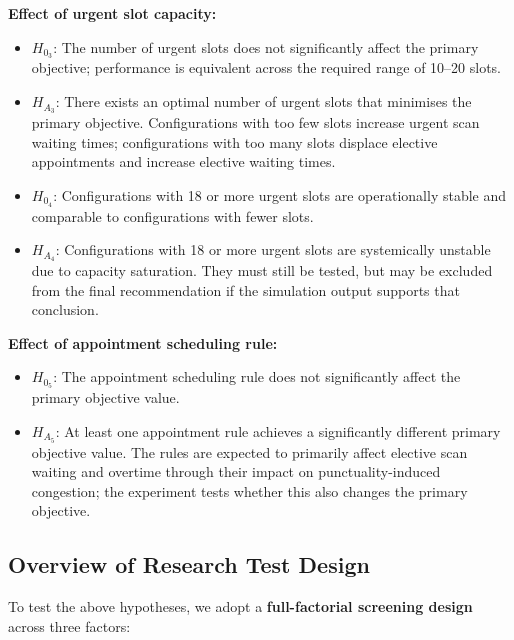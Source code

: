 \documentclass[12pt, a4paper]{article}
\begin{document}
\textbf{Effect of urgent slot capacity:}
\begin{itemize}
    \item $H_{0_3}$: The number of urgent slots does not significantly affect the primary objective; performance is equivalent across the required range of 10--20 slots.
    \item $H_{A_3}$: There exists an optimal number of urgent slots that minimises the primary objective. Configurations with too few slots increase urgent scan waiting times; configurations with too many slots displace elective appointments and increase elective waiting times.
    \item $H_{0_4}$: Configurations with 18 or more urgent slots are operationally stable and comparable to configurations with fewer slots.
    \item $H_{A_4}$: Configurations with 18 or more urgent slots are systemically unstable due to capacity saturation. They must still be tested, but may be excluded from the final recommendation if the simulation output supports that conclusion.
\end{itemize}

\textbf{Effect of appointment scheduling rule:}
\begin{itemize}
    \item $H_{0_5}$: The appointment scheduling rule does not significantly affect the primary objective value.
    \item $H_{A_5}$: At least one appointment rule achieves a significantly different primary objective value. The rules are expected to primarily affect elective scan waiting and overtime through their impact on punctuality-induced congestion; the experiment tests whether this also changes the primary objective.
\end{itemize}

\subsection{Overview of Research Test Design}

To test the above hypotheses, we adopt a \textbf{full-factorial screening design} across three factors:
\end{document}
